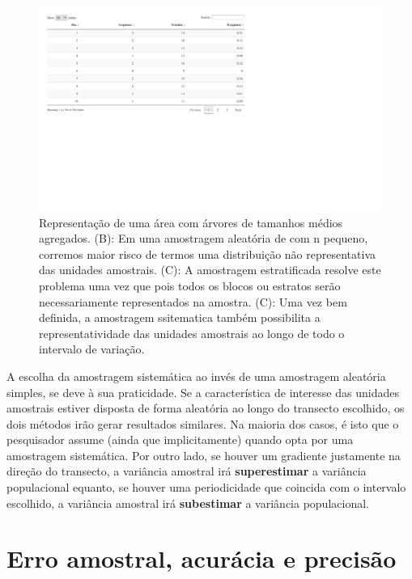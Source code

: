 \documentclass[
]{book}
\begin{document}
\begin{figure}

{\centering \includegraphics[width=13.89in]{probest-cambientais_files/figure-latex/unnamed-chunk-172-1} 

}

\caption{Representação de uma área com árvores de tamanhos médios agregados. (B): Em uma amostragem aleatória de com n pequeno, corremos maior risco de termos uma distribuição não representativa das unidades amostrais. (C): A amostragem estratificada resolve este problema uma vez que pois todos os blocos ou estratos serão necessariamente representados na amostra. (C): Uma vez bem definida, a amostragem ssitematica também possibilita a representatividade das unidades amostrais ao longo de todo o intervalo de variação.}\label{fig:unnamed-chunk-172}
\end{figure}

A escolha da amostragem sistemática ao invés de uma amostragem aleatória simples, se deve à sua praticidade. Se a característica de interesse das unidades amostrais estiver disposta de forma aleatória ao longo do transecto escolhido, os dois métodos irão gerar resultados similares. Na maioria dos casos, é isto que o pesquisador assume (ainda que implicitamente) quando opta por uma amostragem sistemática. Por outro lado, se houver um gradiente justamente na direção do transecto, a variância amostral irá \textbf{superestimar} a variância populacional equanto, se houver uma periodicidade que coincida com o intervalo escolhido, a variância amostral irá \textbf{subestimar} a variância populacional.

\hypertarget{erro-amostral-acuruxe1cia-e-precisuxe3o}{%
\section{Erro amostral, acurácia e precisão}\label{erro-amostral-acuruxe1cia-e-precisuxe3o}}
\end{document}
